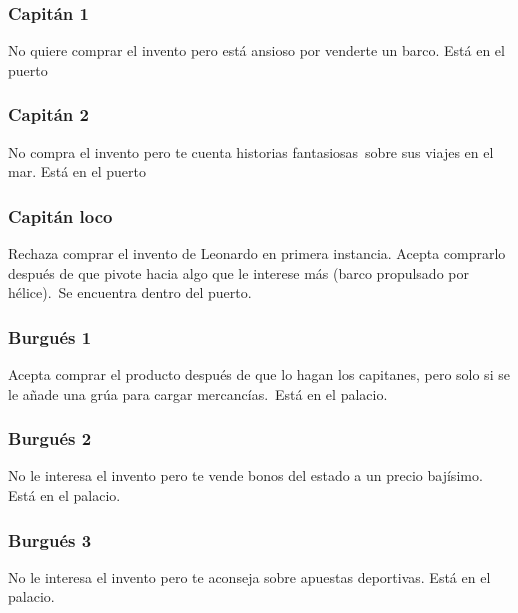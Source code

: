 \subsubsection[Capit\'an 1]{ Capit\'an 1}
\hypertarget{Toc484614235}{}{
No quiere comprar el invento pero est\'a ansioso por venderte un barco. Est\'a en el puerto}

\subsubsection[Capit\'an 2]{ Capit\'an 2}
\hypertarget{Toc484614236}{}{
No compra el invento pero te cuenta historias fantasiosas\ sobre sus viajes en el mar. Est\'a en el puerto}

\subsubsection[Capit\'an loco]{ Capit\'an loco}
\hypertarget{Toc484614237}{}{
Rechaza comprar el invento de Leonardo en primera instancia. Acepta comprarlo despu\'es de que pivote hacia algo que le
interese m\'as (barco propulsado por h\'elice).\ Se encuentra dentro del puerto.}

\subsubsection[Burgu\'es 1]{ Burgu\'es 1}
\hypertarget{Toc484614238}{}{
Acepta comprar el producto despu\'es de que lo hagan los capitanes, pero solo si se le a\~nade una gr\'ua para cargar
mercanc\'ias.\ Est\'a en el palacio.}

\subsubsection[Burgu\'es 2]{ Burgu\'es 2}
\hypertarget{Toc484614239}{}{
No le interesa el invento pero te vende bonos del estado a un precio baj\'isimo. Est\'a en el palacio.}

\subsubsection[Burgu\'es 3]{ Burgu\'es 3}
\hypertarget{Toc484614240}{}{
No le interesa el invento pero te aconseja sobre apuestas deportivas. Est\'a en el palacio.}

